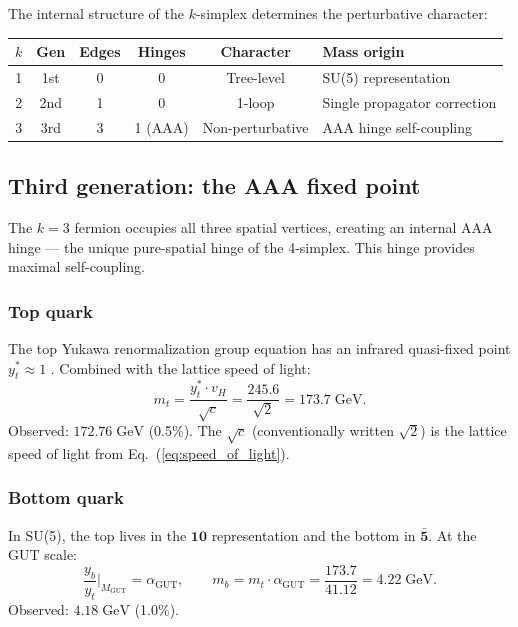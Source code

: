 \documentclass[12pt]{article}
\theoremstyle{remark}
\theoremstyle{definition}
\begin{document}
The internal structure of the $k$-simplex determines the perturbative character:

\begin{center}
\begin{tabular}{cccccl}
\hline
$k$ & Gen & Edges & Hinges & Character & Mass origin \\
\hline
1 & 1st & 0 & 0 & Tree-level & SU(5) representation \\
2 & 2nd & 1 & 0 & 1-loop & Single propagator correction \\
3 & 3rd & 3 & 1 (AAA) & Non-perturbative & AAA hinge self-coupling \\
\hline
\end{tabular}
\end{center}

\subsection{Third generation: the AAA fixed point}

The $k = 3$ fermion occupies all three spatial vertices, creating an internal AAA hinge --- the unique pure-spatial hinge of the 4-simplex. This hinge provides maximal self-coupling.

\subsubsection{Top quark}

The top Yukawa renormalization group equation has an infrared quasi-fixed point $y^*_t \approx 1$ \cite{Pendleton, Hill}. Combined with the lattice speed of light:
\begin{equation}
m_t = \frac{y^*_t \cdot v_H}{\sqrt{c}} = \frac{245.6}{\sqrt{2}} = 173.7\;\text{GeV}.
\end{equation}
Observed: $172.76\;\text{GeV}$ (0.5\%). The $\sqrt{c}$ (conventionally written $\sqrt{2}$) is the lattice speed of light from Eq.~(\ref{eq:speed_of_light}).

\subsubsection{Bottom quark}

In SU(5), the top lives in the $\mathbf{10}$ representation and the bottom in $\bar{\mathbf{5}}$. At the GUT scale:
\begin{equation}
\frac{y_b}{y_t}\bigg|_{M_\text{GUT}} = \alpha_\text{GUT}, \qquad m_b = m_t \cdot \alpha_\text{GUT} = \frac{173.7}{41.12} = 4.22\;\text{GeV}.
\end{equation}
Observed: $4.18\;\text{GeV}$ (1.0\%).
\end{document}
